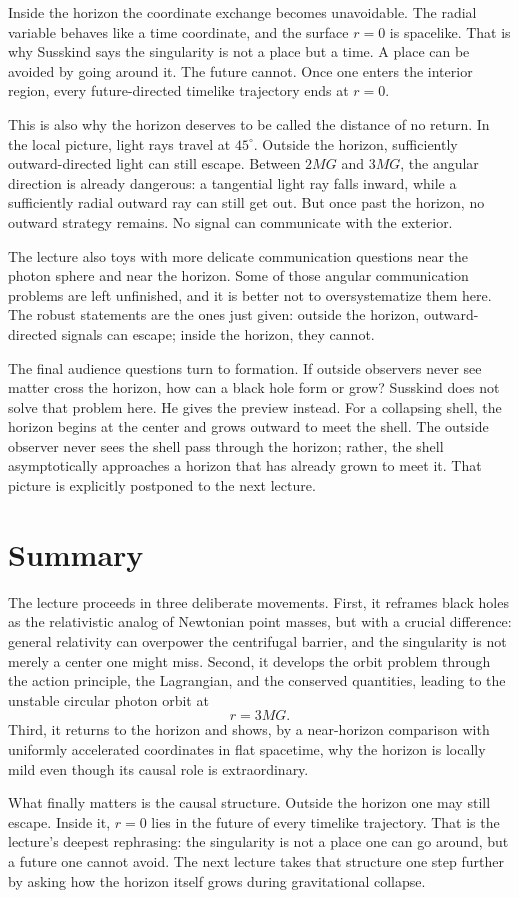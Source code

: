 Inside the horizon the coordinate exchange becomes unavoidable. The radial variable behaves like a time coordinate, and the surface \(r=0\) is spacelike. That is why Susskind says the singularity is not a place but a time. A place can be avoided by going around it. The future cannot. Once one enters the interior region, every future-directed timelike trajectory ends at \(r=0\).

This is also why the horizon deserves to be called the distance of no return. In the local picture, light rays travel at \(45^\circ\). Outside the horizon, sufficiently outward-directed light can still escape. Between \(2MG\) and \(3MG\), the angular direction is already dangerous: a tangential light ray falls inward, while a sufficiently radial outward ray can still get out. But once past the horizon, no outward strategy remains. No signal can communicate with the exterior.

The lecture also toys with more delicate communication questions near the photon sphere and near the horizon. Some of those angular communication problems are left unfinished, and it is better not to oversystematize them here. The robust statements are the ones just given: outside the horizon, outward-directed signals can escape; inside the horizon, they cannot.

The final audience questions turn to formation. If outside observers never see matter cross the horizon, how can a black hole form or grow? Susskind does not solve that problem here. He gives the preview instead. For a collapsing shell, the horizon begins at the center and grows outward to meet the shell. The outside observer never sees the shell pass through the horizon; rather, the shell asymptotically approaches a horizon that has already grown to meet it. That picture is explicitly postponed to the next lecture.

\section{Summary}

The lecture proceeds in three deliberate movements. First, it reframes black holes as the relativistic analog of Newtonian point masses, but with a crucial difference: general relativity can overpower the centrifugal barrier, and the singularity is not merely a center one might miss. Second, it develops the orbit problem through the action principle, the Lagrangian, and the conserved quantities, leading to the unstable circular photon orbit at
\begin{equation}
r=3MG.
\end{equation}
Third, it returns to the horizon and shows, by a near-horizon comparison with uniformly accelerated coordinates in flat spacetime, why the horizon is locally mild even though its causal role is extraordinary.

What finally matters is the causal structure. Outside the horizon one may still escape. Inside it, \(r=0\) lies in the future of every timelike trajectory. That is the lecture's deepest rephrasing: the singularity is not a place one can go around, but a future one cannot avoid. The next lecture takes that structure one step further by asking how the horizon itself grows during gravitational collapse.